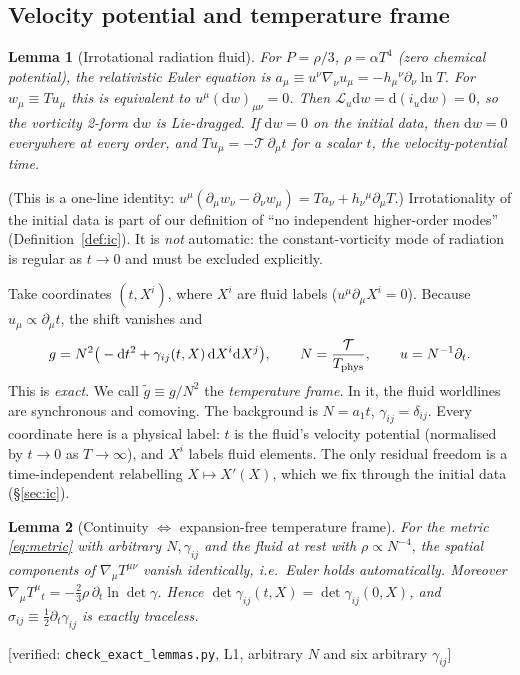 \documentclass[11pt]{article}
\newtheorem{lemma}{Lemma}
\theoremstyle{definition}
\theoremstyle{remark}
\newcommand{\Tref}{\mathcal{T}}
\newcommand{\dd}{\mathrm{d}}
\newcommand{\status}[1]{\textsf{[#1]}}
\begin{document}
\subsection{Velocity potential and temperature frame}

\begin{lemma}[Irrotational radiation fluid]\label{lem:kelvin}
For $P=\rho/3$, $\rho=\alpha T^4$ (zero chemical potential), the relativistic
Euler equation is
$a_\mu\equiv u^\nu\nabla_\nu u_\mu=-h_\mu{}^\nu\partial_\nu\ln T$.
For $w_\mu\equiv Tu_\mu$ this is equivalent to $u^\mu(\dd w)_{\mu\nu}=0$.
Then $\mathcal L_u\dd w=\dd(i_u\dd w)=0$, so the vorticity 2-form $\dd w$ is
Lie-dragged. If $\dd w=0$ on the initial data, then $\dd w=0$ everywhere at
every order, and $Tu_\mu=-\Tref\,\partial_\mu t$ for a scalar $t$, the
velocity-potential time.
\end{lemma}
\noindent
(This is a one-line identity: $u^\mu(\partial_\mu w_\nu-\partial_\nu w_\mu)
=Ta_\nu+h_\nu{}^\mu\partial_\mu T$.) Irrotationality of the initial data is
part of our definition of ``no independent higher-order modes''
(Definition~\ref{def:ic}). It is \emph{not} automatic: the constant-vorticity
mode of radiation is regular as $t\to0$ and must be excluded explicitly.

Take coordinates $(t,X^i)$, where $X^i$ are fluid labels ($u^\mu\partial_\mu
X^i=0$). Because $u_\mu\propto\partial_\mu t$, the shift vanishes and
\begin{equation}\label{eq:metric}
g=N^2\big(-\dd t^2+\gamma_{ij}(t,X)\,\dd X^i\dd X^j\big),\qquad
N=\frac{\Tref}{T_{\rm phys}},\qquad u=N^{-1}\partial_t .
\end{equation}
This is \emph{exact}. We call $\tilde g\equiv g/N^2$ the \emph{temperature
frame}. In it, the fluid worldlines are synchronous and comoving. The
background is $N=a_1t$, $\gamma_{ij}=\delta_{ij}$. Every coordinate here is a
physical label: $t$ is the fluid's velocity potential (normalised by
$t\to0$ as $T\to\infty$), and $X^i$ labels fluid elements. The only residual
freedom is a time-independent relabelling $X\mapsto X'(X)$, which we fix
through the initial data (\S\ref{sec:ic}).

\begin{lemma}[Continuity $\Leftrightarrow$ expansion-free temperature frame]\label{lem:L1}
For the metric \eqref{eq:metric} with arbitrary $N,\gamma_{ij}$ and the fluid
at rest with $\rho\propto N^{-4}$, the spatial components of
$\nabla_\mu T^{\mu\nu}$ vanish identically, i.e.\ Euler holds automatically.
Moreover
$\nabla_\mu T^{\mu}{}_t=-\tfrac23\rho\,\partial_t\ln\det\gamma$.
Hence $\det\gamma_{ij}(t,X)=\det\gamma_{ij}(0,X)$, and
$\sigma_{ij}\equiv\tfrac12\partial_t\gamma_{ij}$ is exactly traceless.
\end{lemma}
\status{verified: \texttt{check\_exact\_lemmas.py}, L1, arbitrary $N$ and six arbitrary $\gamma_{ij}$}
\end{document}
